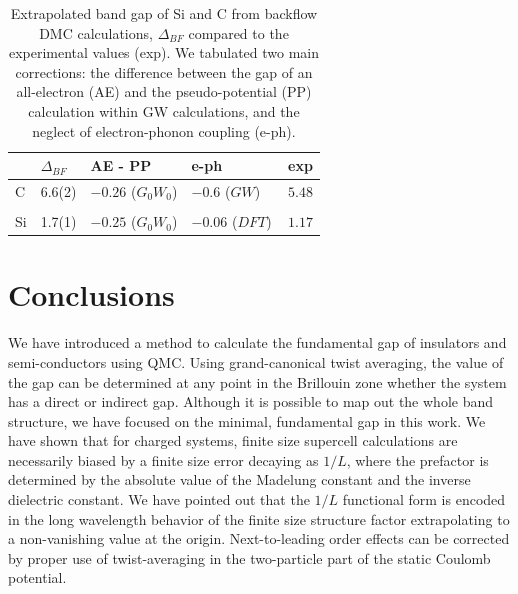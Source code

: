 \begin{table}
\centering
\caption{Extrapolated band gap
of Si and C from backflow DMC calculations, $\Delta_{BF}$
compared to the experimental values (exp).
We tabulated two main corrections:
the difference  between the gap of an all-electron (AE) and the pseudo-potential (PP)
calculation within GW calculations, and
the neglect of electron-phonon coupling (e-ph).
\label{tab:c-si-gap-corr}}
\begin{tabular}{lllll}
\hline\hline
& $\Delta_{BF}$ & AE - PP & e-ph  & exp \\
\hline
C & 6.6(2) &   $-0.26$ ($G_0W_0$) \cite{GomezAbal08} & $-0.6$ ($GW$)~~\cite{Giustino10} & $5.48$ \cite{exp}\\
\hline \\
Si &  1.7(1)  & $-0.25$ ($G_0W_0$)\cite{GomezAbal08}  & $-0.06$ ($DFT$) \cite{Monserrat14} & $1.17$ \cite{exp} \\
\hline\hline
\end{tabular}
\end{table}


\section{Conclusions}
\label{sec:bg-conclude}

We have introduced a method to calculate the fundamental gap of insulators and semi-conductors
using QMC. Using grand-canonical twist averaging, 
the value of the gap can be determined at any point in the Brillouin zone whether the system has a direct or indirect gap. Although it is 
possible to map out the whole band structure, we have focused on the minimal, fundamental gap
in this work. We have shown that for charged systems, finite size supercell calculations
are necessarily biased by a finite size error decaying as $1/L$, where the prefactor
is determined by the absolute value of the Madelung constant and the inverse dielectric constant.
We have pointed out that the $1/L$ functional form is encoded in the long wavelength behavior of
the finite size structure factor extrapolating to a non-vanishing value at the origin.
Next-to-leading order effects can be corrected by proper use of twist-averaging in the
two-particle part of the static Coulomb potential. 


